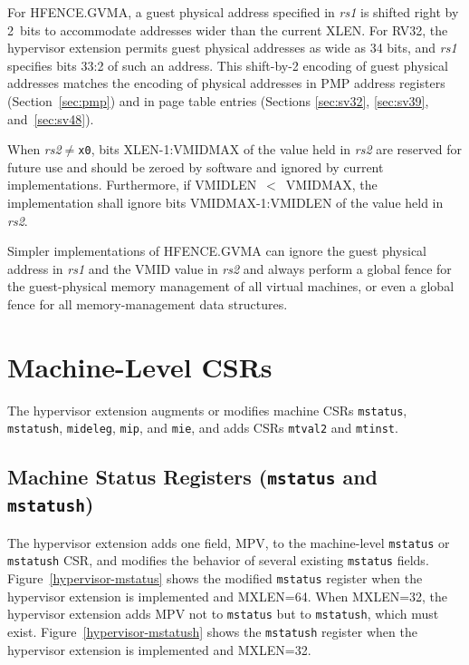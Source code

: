 \begin{commentary}
For HFENCE.GVMA, a guest physical address specified in {\em rs1} is shifted
right by 2~bits to accommodate addresses wider than the current XLEN.
For RV32, the hypervisor extension permits guest physical addresses as wide as
34 bits, and {\em rs1} specifies bits 33:2 of such an address.
This shift-by-2 encoding of guest physical addresses matches the encoding of
physical addresses in PMP address registers (Section~\ref{sec:pmp}) and in page
table entries (Sections \ref{sec:sv32}, \ref{sec:sv39}, and~\ref{sec:sv48}).
\end{commentary}

When {\em rs2}$\neq${\tt x0}, bits XLEN-1:VMIDMAX of the value held in {\em
rs2} are reserved for future use and should be zeroed by software and ignored
by current implementations.
Furthermore, if VMIDLEN~$<$~VMIDMAX, the implementation shall ignore bits
VMIDMAX-1:VMIDLEN of the value held in {\em rs2}.

\begin{commentary}
Simpler implementations of HFENCE.GVMA can ignore the guest physical address in
{\em rs1} and the VMID value in {\em rs2} and always perform a global fence for
the guest-physical memory management of all virtual machines, or even a global
fence for all memory-management data structures.
\end{commentary}

\section{Machine-Level CSRs}

The hypervisor extension augments or modifies machine CSRs {\tt mstatus},
{\tt mstatush}, {\tt mideleg}, {\tt mip}, and {\tt mie}, and
adds CSRs {\tt mtval2} and {\tt mtinst}.

\subsection{Machine Status Registers ({\tt mstatus} and {\tt mstatush})}

The hypervisor extension adds one field, MPV, to the
machine-level {\tt mstatus} or {\tt mstatush} CSR, and modifies the
behavior of several existing {\tt mstatus} fields.
Figure~\ref{hypervisor-mstatus} shows the modified {\tt mstatus} register
when the hypervisor extension is implemented and MXLEN=64.
When MXLEN=32, the hypervisor extension adds MPV not to {\tt mstatus}
but to {\tt mstatush}, which must exist.
Figure~\ref{hypervisor-mstatush} shows the {\tt mstatush} register when
the hypervisor extension is implemented and MXLEN=32.

